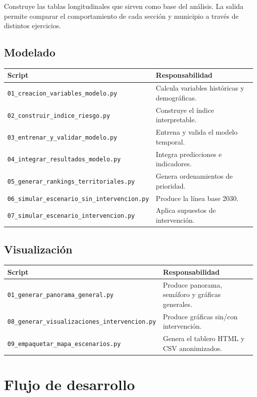 \documentclass[11pt,a4paper]{article}
\begin{document}
Construye las tablas longitudinales que sirven como base del análisis. La salida permite comparar el comportamiento de cada sección y municipio a través de distintos ejercicios.

\subsection{Modelado}

\begin{longtable}{p{}p{}}
\toprule
\textbf{Script} & \textbf{Responsabilidad}\\
\midrule
\texttt{01\_creacion\_variables\_modelo.py} & Calcula variables históricas y demográficas.\\
\texttt{02\_construir\_indice\_riesgo.py} & Construye el índice interpretable.\\
\texttt{03\_entrenar\_y\_validar\_modelo.py} & Entrena y valida el modelo temporal.\\
\texttt{04\_integrar\_resultados\_modelo.py} & Integra predicciones e indicadores.\\
\texttt{05\_generar\_rankings\_territoriales.py} & Genera ordenamientos de prioridad.\\
\texttt{06\_simular\_escenario\_sin\_intervencion.py} & Produce la línea base 2030.\\
\texttt{07\_simular\_escenario\_intervencion.py} & Aplica supuestos de intervención.\\
\bottomrule
\end{longtable}

\subsection{Visualización}

\begin{longtable}{p{}p{}}
\toprule
\textbf{Script} & \textbf{Responsabilidad}\\
\midrule
\texttt{01\_generar\_panorama\_general.py} & Produce panorama, semáforo y gráficas generales.\\
\texttt{08\_generar\_visualizaciones\_intervencion.py} & Produce gráficas sin/con intervención.\\
\texttt{09\_empaquetar\_mapa\_escenarios.py} & Genera el tablero HTML y CSV anonimizados.\\
\bottomrule
\end{longtable}

\section{Flujo de desarrollo}
\end{document}
